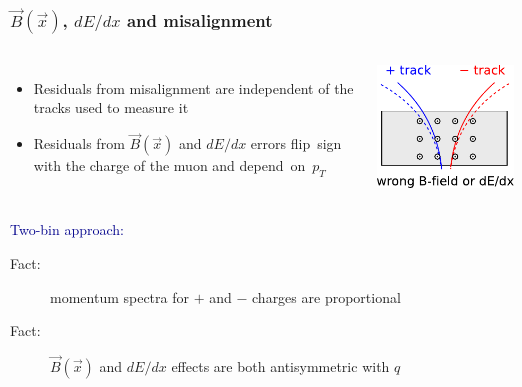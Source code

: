 \documentclass[compress]{beamer}
\begin{document}
\begin{frame}
\frametitle{$\vec{B}(\vec{x})$, $dE/dx$ and misalignment}

\begin{columns}
\vspace{-0.5 cm}
\begin{itemize}
\item Residuals from misalignment are independent of the tracks used to measure it
\item Residuals from $\vec{B}(\vec{x})$ and $dE/dx$ errors \mbox{flip sign\hspace{-0.5 cm}} with the charge
  of the muon and \mbox{depend on $p_T$\hspace{-1 cm}}
\end{itemize}

\vspace{0.5 cm}
\includegraphics[width=\linewidth]{antisymmetric_bfield.pdf}
\end{columns}

\vspace{-0.2 cm}
\textcolor{darkblue}{\large Two-bin approach:}
\begin{description}
\item[Fact:] momentum spectra for $+$ and $-$ charges are proportional
\item[Fact:] $\vec{B}(\vec{x})$ and $dE/dx$ effects are both antisymmetric with $q$
\end{description}


\end{frame}
\end{document}
